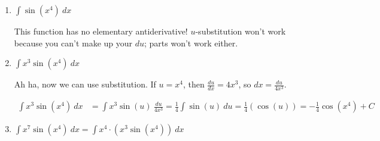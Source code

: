 \begin{enumerate}[leftmargin=0pt]
\begin{enumerate}
\begin{blue}
    \[\begin{array}{ll}
        u = \ln(x^2) &  \\
         & dv = x\ dx
    \end{array}
    \textrm{ so }
    \begin{array}{ll}
        u = \ln(x^2) & v = \tfrac12 x^2 \\
        du = \frac{1}{x^2}\cdot 2x\ dx & dv = x\ dx 
    \end{array}
    \]
    
    Applying the integration by parts formula:
    \begin{align*}
        \int x\ln(x^2)\ dx &= \ln(x^2) \cdot \tfrac12 x^2 - 
        \int \frac12 x^2 \cdot \frac{1}{x^2} \cdot 2x\ dx \\
        &= \ln(x^2) \cdot \tfrac12 x^2 - \int x\ dx \textrm{ (!!)} \\
        &= \frac12 x^2 \ln(x^2) - \frac12 x^2 + C
    \end{align*}
    \end{blue}
    
    \item $\int \sin(x^4)\ dx$
    
    \begin{red}
    This function has no elementary antiderivative! $u$-substitution won't work because you can't make up your $du$; parts won't work either.
    \end{red}
    
    \item $\int x^3\sin(x^4)\ dx$
    
    \begin{red}
    Ah ha, now we can use substitution. If $u = x^4$, then $\frac{du}{dx} = 4x^3$, so $dx = \frac{du}{4x^3}$.
    
    \begin{align*}
        \int x^3\sin(x^4)\ dx &= \int x^3 \sin(u)\ \frac{du}{4x^3} = \frac14 \int \sin(u)\ du = \frac14(\cos(u)) = -\frac14\cos(x^4)+ C
    \end{align*}
    \end{red}
    
    \item $\int x^7 \sin(x^4)\ dx = \int x^4\cdot (x^3\sin(x^4))\ dx$
    

\end{enumerate}
\end{enumerate}
